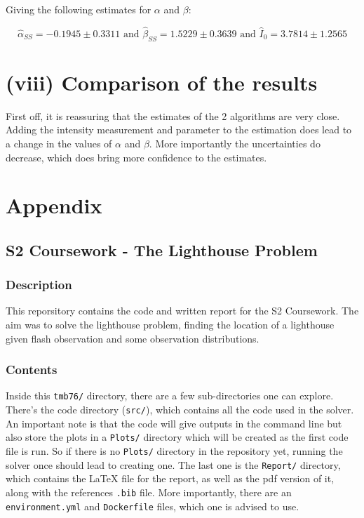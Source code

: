 \documentclass[12pt]{report} %
\begin{document}
Giving the following estimates for $\alpha$ and $\beta$:

\begin{equation}
    \hat{\alpha}_{SS} = -0.1945 \pm 0.3311 \text{ and } \hat{\beta}_{SS} = 1.5229 \pm 0.3639 \text{ and } \hat{I}_{0} = 3.7814 \pm 1.2565
\end{equation}


\chapter{(viii) Comparison of the results}

First off, it is reassuring that the estimates of the 2 algorithms are very close. Adding the intensity measurement and parameter to the estimation does lead to a change in the values of $\alpha$ and $\beta$. More importantly the uncertainties do decrease, which does bring more confidence to the estimates.


\chapter{Appendix}

\section{S2 Coursework - The Lighthouse Problem}

\subsection{Description}
This reporsitory contains the code and written report for the S2 Coursework. The aim was to solve the lighthouse problem, finding the location of a lighthouse given flash observation and some observation distributions.

\subsection{Contents}

Inside this \texttt{tmb76/} directory, there are a few sub-directories one can explore. There's the code directory (\texttt{src/}), which contains all the code used in the solver. An important note is that the code will give outputs in the command line but also store the plots in a \texttt{Plots/} directory which will be created as the first code file is run. So if there is no \texttt{Plots/} directory in the repository yet, running the solver once should lead to creating one. The last one is the \texttt{Report/} directory, which contains the LaTeX file for the report, as well as the pdf version of it, along with the references \texttt{.bib} file.
More importantly, there are an \texttt{environment.yml} and \texttt{Dockerfile} files, which one is advised to use.
\end{document}
